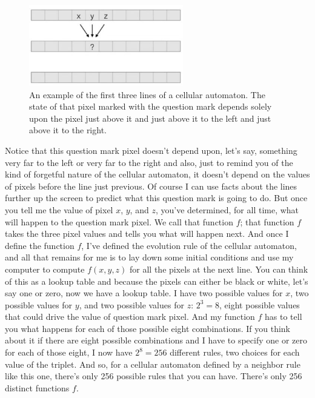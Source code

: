 \documentclass[]{article}
\begin{document}
\begin{figure}[H]
	\begin{center}
		\caption{An example of the first three lines
			of a cellular automaton. The state of that pixel marked
			with the question mark depends solely upon the pixel just above it and just above it to the left and just above it to the right.}\label{fig:cellular-automaton-rule}
		\includegraphics[width=0.6\textwidth]{cellular-automaton-rule}
	\end{center}
\end{figure}
Notice that this question mark pixel doesn't depend upon, let's say, something very far to the left or very far to the right and also, just to remind you of the kind of forgetful nature of the cellular automaton, it doesn't depend on the values of pixels
before the line just previous.
Of course I can use facts about the lines further up the screen to predict
what this question mark is going to do.
But once you tell me the value of pixel $x$, $y$, and $z$, you've determined, for all time, what will happen to the question mark pixel.
We call that function $f$; that function $f$ takes the three pixel values and tells you what will happen next.
And once I define the function $f$, I've defined the evolution rule of the cellular automaton, and all that remains for me is to lay down some initial conditions and use my computer to compute $f(x,y,z)$ for all the pixels at the next line.
You can think of this as a lookup table and because the pixels can either be black or white, let's say one or zero, now we have a lookup table.
I have two possible values for $x$, two possible values for $y$, and two possible values for $z$: $2^3=8$, eight possible values that could drive the value of
question mark pixel.
And my function $f$ has to tell you what happens for each of those possible eight combinations.
If you think about it if there are eight possible combinations and I have to specify one or zero for each of those eight, I now have $2^8=256$ different rules, two choices for each value of the triplet.
And so, for a cellular automaton defined by a neighbor rule like this one, there's only 256 possible rules that you can have.
There's only 256 distinct functions $f$.
\end{document}
